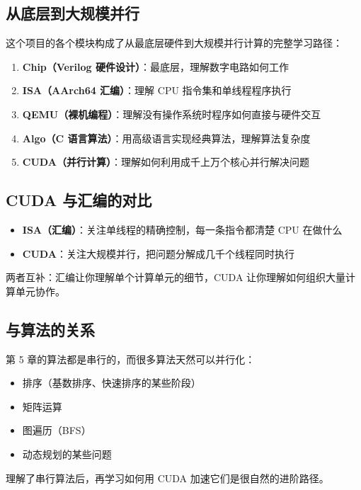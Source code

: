 
\subsection{从底层到大规模并行}

这个项目的各个模块构成了从最底层硬件到大规模并行计算的完整学习路径：

\begin{enumerate}
    \item \textbf{Chip（Verilog 硬件设计）}：最底层，理解数字电路如何工作
    \item \textbf{ISA（AArch64 汇编）}：理解 CPU 指令集和单线程程序执行
    \item \textbf{QEMU（裸机编程）}：理解没有操作系统时程序如何直接与硬件交互
    \item \textbf{Algo（C 语言算法）}：用高级语言实现经典算法，理解算法复杂度
    \item \textbf{CUDA（并行计算）}：理解如何利用成千上万个核心并行解决问题
\end{enumerate}

\subsection{CUDA 与汇编的对比}

\begin{itemize}
    \item \textbf{ISA（汇编）}：关注单线程的精确控制，每一条指令都清楚 CPU 在做什么
    \item \textbf{CUDA}：关注大规模并行，把问题分解成几千个线程同时执行
\end{itemize}

两者互补：汇编让你理解单个计算单元的细节，CUDA 让你理解如何组织大量计算单元协作。

\subsection{与算法的关系}

第 5 章的算法都是串行的，而很多算法天然可以并行化：
\begin{itemize}
    \item 排序（基数排序、快速排序的某些阶段）
    \item 矩阵运算
    \item 图遍历（BFS）
    \item 动态规划的某些问题
\end{itemize}

理解了串行算法后，再学习如何用 CUDA 加速它们是很自然的进阶路径。
